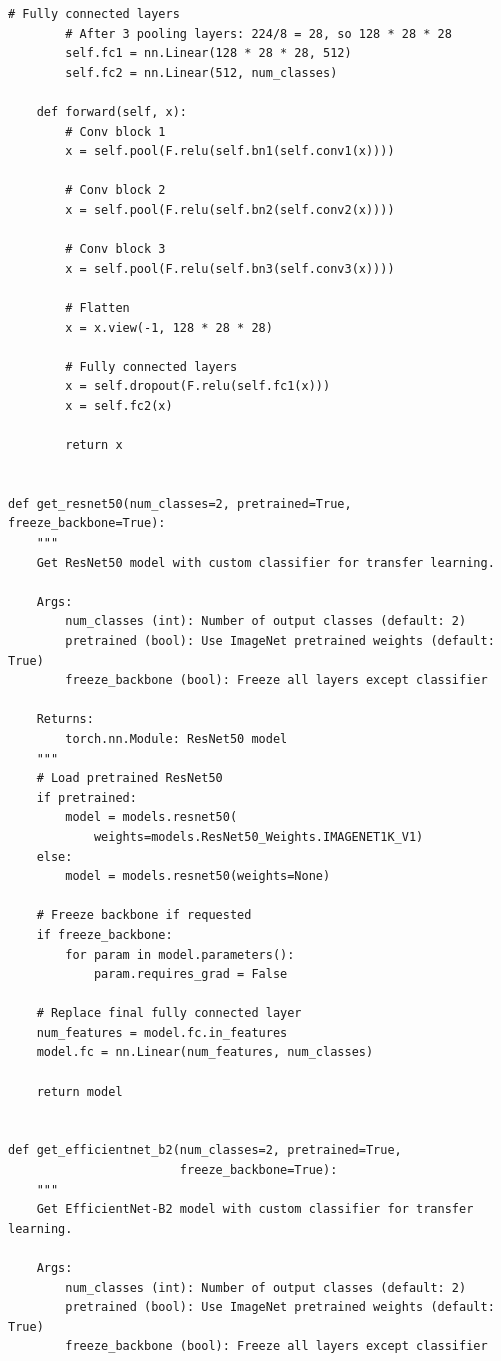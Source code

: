 \documentclass[man,12pt,letterpaper,donotrepeattitle,floatsintext]{apa7}
\begin{document}
\begin{lstlisting}[style=pythonstyle]
        # Fully connected layers
        # After 3 pooling layers: 224/8 = 28, so 128 * 28 * 28
        self.fc1 = nn.Linear(128 * 28 * 28, 512)
        self.fc2 = nn.Linear(512, num_classes)
    
    def forward(self, x):
        # Conv block 1
        x = self.pool(F.relu(self.bn1(self.conv1(x))))
        
        # Conv block 2
        x = self.pool(F.relu(self.bn2(self.conv2(x))))
        
        # Conv block 3
        x = self.pool(F.relu(self.bn3(self.conv3(x))))
        
        # Flatten
        x = x.view(-1, 128 * 28 * 28)
        
        # Fully connected layers
        x = self.dropout(F.relu(self.fc1(x)))
        x = self.fc2(x)
        
        return x


def get_resnet50(num_classes=2, pretrained=True, freeze_backbone=True):
    """
    Get ResNet50 model with custom classifier for transfer learning.
    
    Args:
        num_classes (int): Number of output classes (default: 2)
        pretrained (bool): Use ImageNet pretrained weights (default: True)
        freeze_backbone (bool): Freeze all layers except classifier
    
    Returns:
        torch.nn.Module: ResNet50 model
    """
    # Load pretrained ResNet50
    if pretrained:
        model = models.resnet50(
            weights=models.ResNet50_Weights.IMAGENET1K_V1)
    else:
        model = models.resnet50(weights=None)
    
    # Freeze backbone if requested
    if freeze_backbone:
        for param in model.parameters():
            param.requires_grad = False
    
    # Replace final fully connected layer
    num_features = model.fc.in_features
    model.fc = nn.Linear(num_features, num_classes)
    
    return model


def get_efficientnet_b2(num_classes=2, pretrained=True, 
                        freeze_backbone=True):
    """
    Get EfficientNet-B2 model with custom classifier for transfer learning.
    
    Args:
        num_classes (int): Number of output classes (default: 2)
        pretrained (bool): Use ImageNet pretrained weights (default: True)
        freeze_backbone (bool): Freeze all layers except classifier
    

\end{lstlisting}
\end{document}
